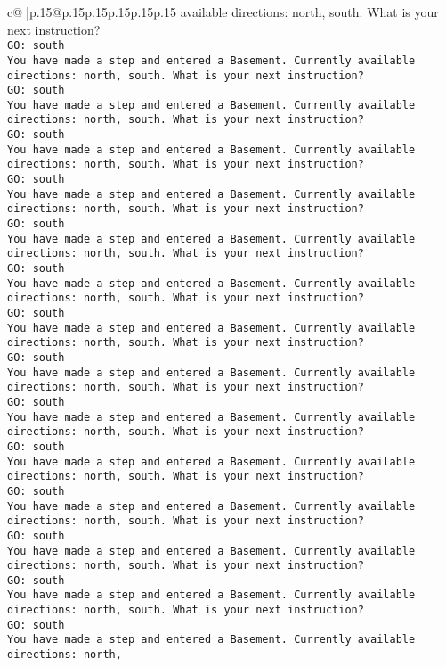 \documentclass{article}
\begin{document}
{\begin{supertabular}{c@{$\;$}|p{.15\linewidth}@{}p{.15\linewidth}p{.15\linewidth}p{.15\linewidth}p{.15\linewidth}p{.15\linewidth}}
{{{available directions: north, south. What is your next instruction?\\ \tt GO: south\\ \tt You have made a step and entered a Basement. Currently available directions: north, south. What is your next instruction?\\ \tt GO: south\\ \tt You have made a step and entered a Basement. Currently available directions: north, south. What is your next instruction?\\ \tt GO: south\\ \tt You have made a step and entered a Basement. Currently available directions: north, south. What is your next instruction?\\ \tt GO: south\\ \tt You have made a step and entered a Basement. Currently available directions: north, south. What is your next instruction?\\ \tt GO: south\\ \tt You have made a step and entered a Basement. Currently available directions: north, south. What is your next instruction?\\ \tt GO: south\\ \tt You have made a step and entered a Basement. Currently available directions: north, south. What is your next instruction?\\ \tt GO: south\\ \tt You have made a step and entered a Basement. Currently available directions: north, south. What is your next instruction?\\ \tt GO: south\\ \tt You have made a step and entered a Basement. Currently available directions: north, south. What is your next instruction?\\ \tt GO: south\\ \tt You have made a step and entered a Basement. Currently available directions: north, south. What is your next instruction?\\ \tt GO: south\\ \tt You have made a step and entered a Basement. Currently available directions: north, south. What is your next instruction?\\ \tt GO: south\\ \tt You have made a step and entered a Basement. Currently available directions: north, south. What is your next instruction?\\ \tt GO: south\\ \tt You have made a step and entered a Basement. Currently available directions: north, south. What is your next instruction?\\ \tt GO: south\\ \tt You have made a step and entered a Basement. Currently available directions: north, south. What is your next instruction?\\ \tt GO: south\\ \tt You have made a step and entered a Basement. Currently available directions: north, }}}
\end{supertabular}}
\end{document}
